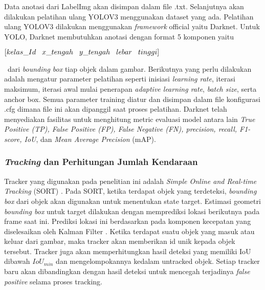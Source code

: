 \documentclass[../thesis.tex]{subfiles}
\begin{document}
Data anotasi dari LabelImg akan disimpan dalam file .txt. Selanjutnya akan dilakukan pelatihan ulang YOLOV3 menggunakan dataset yang ada. Pelatihan ulang YOLOV3 dilakukan menggunakan \textit{framework} official yaitu Darknet. Untuk YOLO, Darknet membutuhkan anotasi dengan format
5 komponen yaitu \\ 
\centerline{$[kelas\_Id \hspace{3mm} x\_tengah \hspace{3mm} y\_tengah \hspace{3mm} lebar \hspace{3mm} tinggi]$}\
dari \textit{bounding box} tiap objek dalam gambar. Berikutnya yang perlu dilakukan adalah mengatur parameter pelatihan seperti inisiasi \textit{learning rate}, iterasi maksimum, iterasi awal mulai penerapan \textit{adaptive learning rate}, \textit{batch size}, serta anchor box. Semua parameter training diatur dan disimpan dalam file konfigurasi .cfg dimana file ini akan 
dipanggil saat proses pelatihan. Darknet telah menyediakan fasilitas untuk menghitung metric evaluasi model antara lain \textit{True Positive (TP), False Positive (FP), False Negative (FN), precision, recall, F1-score, IoU}, dan \textit{Mean Average Precision} (mAP).

\subsubsection{\textit{Tracking} dan Perhitungan Jumlah Kendaraan}
Tracker yang digunakan pada penelitian ini adalah \textit{Simple Online and Real-time Tracking} (SORT) \cite{SORT}. Pada SORT, ketika terdapat objek yang terdeteksi, \textit{bounding box} dari objek akan digunakan untuk menentukan state target. Estimasi geometri \textit{bounding box} untuk target dilakukan dengan memprediksi lokasi berikutnya pada frame saat ini. Prediksi lokasi ini berdasarkan pada komponen kecepatan yang diselesaikan oleh Kalman Filter \cite{Kalman}.
Ketika terdapat suatu objek yang masuk atau keluar dari gambar, maka tracker akan memberikan id unik kepada objek tersebut. Tracker juga akan memperhitungkan hasil deteksi yang memiliki IoU dibawah $IoU_{min}$ dan mengelompokannya kedalam untracked objek. Setiap tracker baru akan dibandingkan dengan hasil deteksi untuk mencegah terjadinya \textit{false positive} selama proses tracking.
\end{document}
